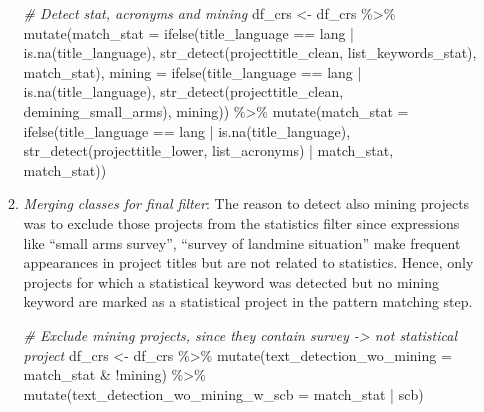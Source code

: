 \documentclass[
]{article}
\newenvironment{Shaded}{\begin{snugshade}}{\end{snugshade}}
\newcommand{\AttributeTok}[1]{\textcolor[rgb]{0.77,0.63,0.00}{#1}}
\newcommand{\CommentTok}[1]{\textcolor[rgb]{0.56,0.35,0.01}{\textit{#1}}}
\newcommand{\FunctionTok}[1]{\textcolor[rgb]{0.00,0.00,0.00}{#1}}
\newcommand{\NormalTok}[1]{#1}
\newcommand{\OtherTok}[1]{\textcolor[rgb]{0.56,0.35,0.01}{#1}}
\newcommand{\SpecialCharTok}[1]{\textcolor[rgb]{0.00,0.00,0.00}{#1}}
\begin{document}
\begin{enumerate}
\begin{enumerate}
\begin{Shaded}
\begin{Highlighting}[]
\CommentTok{\# Detect stat, acronyms and mining }
\NormalTok{df\_crs }\OtherTok{\textless{}{-}}\NormalTok{ df\_crs }\SpecialCharTok{\%\textgreater{}\%}
  \FunctionTok{mutate}\NormalTok{(}\AttributeTok{match\_stat =} \FunctionTok{ifelse}\NormalTok{(title\_language }\SpecialCharTok{==}\NormalTok{ lang }\SpecialCharTok{|} \FunctionTok{is.na}\NormalTok{(title\_language), }
                             \FunctionTok{str\_detect}\NormalTok{(projecttitle\_clean, list\_keywords\_stat), }
\NormalTok{                             match\_stat),}
         \AttributeTok{mining =} \FunctionTok{ifelse}\NormalTok{(title\_language }\SpecialCharTok{==}\NormalTok{ lang }\SpecialCharTok{|} \FunctionTok{is.na}\NormalTok{(title\_language),}
                         \FunctionTok{str\_detect}\NormalTok{(projecttitle\_clean, demining\_small\_arms),}
\NormalTok{                         mining)) }\SpecialCharTok{\%\textgreater{}\%}
  \FunctionTok{mutate}\NormalTok{(}\AttributeTok{match\_stat =} \FunctionTok{ifelse}\NormalTok{(title\_language }\SpecialCharTok{==}\NormalTok{ lang }\SpecialCharTok{|} \FunctionTok{is.na}\NormalTok{(title\_language),}
                             \FunctionTok{str\_detect}\NormalTok{(projecttitle\_lower, list\_acronyms) }\SpecialCharTok{|}\NormalTok{ match\_stat,}
\NormalTok{                             match\_stat))}
\end{Highlighting}
\end{Shaded}
  \item
    \emph{Merging classes for final filter}: The reason to detect also mining projects was to exclude those projects from the statistics filter since expressions like ``small arms survey'', ``survey of landmine situation'' make frequent appearances in project titles but are not related to statistics. Hence, only projects for which a statistical keyword was detected but no mining keyword are marked as a statistical project in the pattern matching step.

\begin{Shaded}
\begin{Highlighting}[]
\CommentTok{\# Exclude mining projects, since they contain survey {-}\textgreater{} not statistical project}
\NormalTok{df\_crs }\OtherTok{\textless{}{-}}\NormalTok{ df\_crs }\SpecialCharTok{\%\textgreater{}\%}
  \FunctionTok{mutate}\NormalTok{(}\AttributeTok{text\_detection\_wo\_mining =}\NormalTok{ match\_stat }\SpecialCharTok{\&} \SpecialCharTok{!}\NormalTok{mining) }\SpecialCharTok{\%\textgreater{}\%} 
  \FunctionTok{mutate}\NormalTok{(}\AttributeTok{text\_detection\_wo\_mining\_w\_scb =}\NormalTok{ match\_stat }\SpecialCharTok{|}\NormalTok{ scb)}
\end{Highlighting}
\end{Shaded}
  \end{enumerate}
\end{enumerate}
\end{document}
